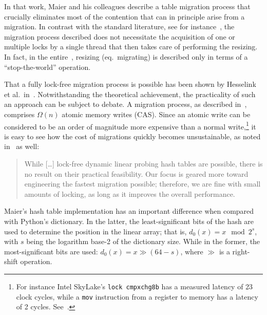 \cite{maier}

In that work, Maier and his colleagues describe a table migration process that crucially eliminates most of the contention that can in principle arise from a migration.
In contrast with the standard literature, see for instance~\cite[Figure~13.30]{art-mp}, the migration process described does not necessitate the acquisition of one or multiple locks by a single thread that then takes care of performing the resizing.
In fact, in the entire~\cite[Chapter~13]{art-mp}, resizing (eq.\ migrating) is described only in terms of a ``stop-the-world'' operation.

That a fully lock-free migration process is possible has been shown by Hesselink et al.\ in~\cite[\S3.5]{hesselink}.
Notwithstanding the theoretical achievement, the practicality of such an approach can be subject to debate.
A migration process, as described in~\cite{hesselink}, comprises $\Omega(n)$ atomic memory writes (CAS).
Since an atomic write can be considered to be an order of magnitude more expensive than a normal write,\footnote{%
	For instance Intel SkyLake's \texttt{lock cmpxchg8b} has a measured latency of 23 clock cycles, while a \texttt{mov} instruction from a register to memory has a latency of 2 cycles.
	See~\cite[Intel Ice Lake and Tiger Lake]{x86-instruction-tables}.
} it is easy to see how the cost of migrations quickly becomes unsustainable, as noted in~\cite{maier} as well:

\begin{quote}
	While [\ldots] lock-free dynamic linear probing hash tables are possible, there is no result on their practical feasibility.
	Our focus is geared more toward engineering the fastest migration possible; therefore, we are fine with small amounts of locking, as long as it improves the overall performance.
\end{quote}

Maier's hash table implementation has an important difference when compared with Python's dictionary.
In the latter, the least-significant bits of the hash are used to determine the position in the linear array; that is, $d_0(x) = x \mod 2^s$, with $s$ being the logarithm base-2 of the dictionary size.
While in the former, the most-significant bits are used: $d_0(x) = x \gg (64 - s)$, where $\gg$ is a right-shift operation.

